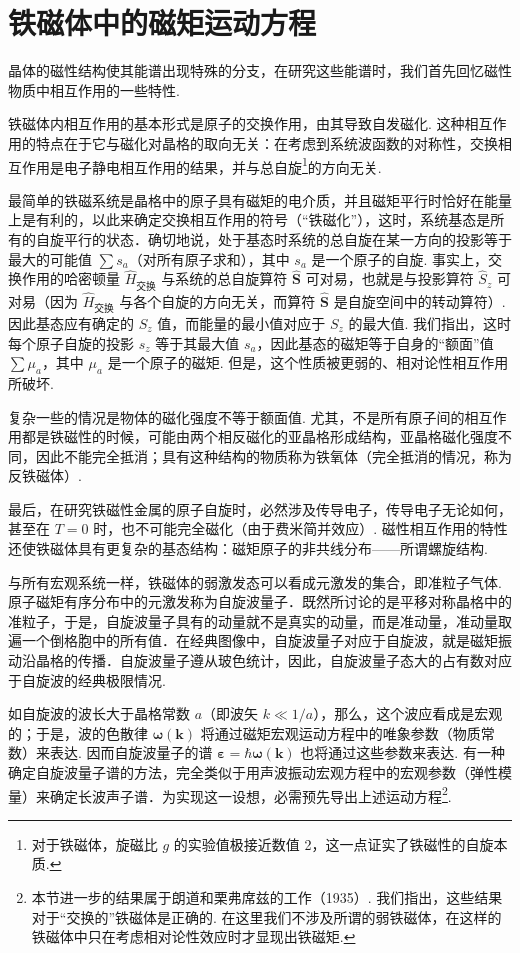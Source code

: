 \section{铁磁体中的磁矩运动方程}

晶体的磁性结构使其能谱出现特殊的分支，在研究这些能谱时，我们首先回忆磁性物质中相互作用的一些特性.

铁磁体内相互作用的基本形式是原子的交换作用，由其导致自发磁化. 这种相互作用的特点在于它与磁化对晶格的取向无关：在考虑到系统波函数的对称性，交换相互作用是电子静电相互作用的结果，并与总自旋\footnote{对于铁磁体，旋磁比 $g$ 的实验值极接近数值 2，这一点证实了铁磁性的自旋本质.}的方向无关.

最简单的铁磁系统是晶格中的原子具有磁矩的电介质，并且磁矩平行时恰好在能量上是有利的，以此来确定交换相互作用的符号（“铁磁化”），这时，系统基态是所有的自旋平行的状态．确切地说，处于基态时系统的总自旋在某一方向的投影等于最大的可能值 $\sum s_a$（对所有原子求和），其中 $s_a$ 是一个原子的自旋. 事实上，交换作用的哈密顿量 $\hat{H}_{\text{交换}}$ 与系统的总自旋算符 $\hat{\bm{S}}$ 可对易，也就是与投影算符 $\hat{S}_z$ 可对易（因为 $\hat{H}_{\text{交换}}$ 与各个自旋的方向无关，而算符 $\hat{\bm{S}}$ 是自旋空间中的转动算符）. 因此基态应有确定的 $S_z$ 值，而能量的最小值对应于 $S_z$ 的最大值. 我们指出，这时每个原子自旋的投影 $s_z$ 等于其最大值 $s_a$，因此基态的磁矩等于自身的“额面”值 $\sum\mu_a$，其中 $\mu_a$ 是一个原子的磁矩. 但是，这个性质被更弱的、相对论性相互作用所破坏.

复杂一些的情况是物体的磁化强度不等于额面值. 尤其，不是所有原子间的相互作用都是铁磁性的时候，可能由两个相反磁化的亚晶格形成结构，亚晶格磁化强度不同，因此不能完全抵消；具有这种结构的物质称为铁氧体（完全抵消的情况，称为反铁磁体）.

最后，在研究铁磁性金属的原子自旋时，必然涉及传导电子，传导电子无论如何，甚至在 $T=0$ 时，也不可能完全磁化（由于费米简并效应）. 磁性相互作用的特性还使铁磁体具有更复杂的基态结构：磁矩原子的非共线分布——所谓螺旋结构.

与所有宏观系统一样，铁磁体的弱激发态可以看成元激发的集合，即准粒子气体. 原子磁矩有序分布中的元激发称为自旋波量子．既然所讨论的是平移对称晶格中的准粒子，于是，自旋波量子具有的动量就不是真实的动量，而是准动量，准动量取遍一个倒格胞中的所有值．在经典图像中，自旋波量子对应于自旋波，就是磁矩振动沿晶格的传播．自旋波量子遵从玻色统计，因此，自旋波量子态大的占有数对应于自旋波的经典极限情况.

如自旋波的波长大于晶格常数 $a$（即波矢 $k\ll1/a$），那么，这个波应看成是宏观的；于是，波的色散律 $\bm{\omega}(\bm{k})$ 将通过磁矩宏观运动方程中的唯象参数（物质常数）来表达. 因而自旋波量子的谱 $\bm{\varepsilon}=\hbar\bm{\omega}(\bm{k})$ 也将通过这些参数来表达. 有一种确定自旋波量子谱的方法，完全类似于用声波振动宏观方程中的宏观参数（弹性模量）来确定长波声子谱．为实现这一设想，必需预先导出上述运动方程\footnote{本节进一步的结果属于朗道和栗弗席兹的工作（1935）. 我们指出，这些结果对于“交换的”铁磁体是正确的. 在这里我们不涉及所谓的弱铁磁体，在这样的铁磁体中只在考虑相对论性效应时才显现出铁磁矩.}.

